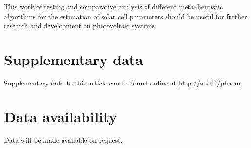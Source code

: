\documentclass[a4paper,fleqn]{cas-sc}
\begin{document}
This work of testing and comparative analysis of
different meta--heuristic algorithms for the estimation
of solar cell parameters should be useful for further research and development on photovoltaic systems.


\section*{Supplementary data}
Supplementary data to this article can be found online at
\url{http://surl.li/phuem}


\section*{Data availability}
Data will be made available on request.




\end{document}

